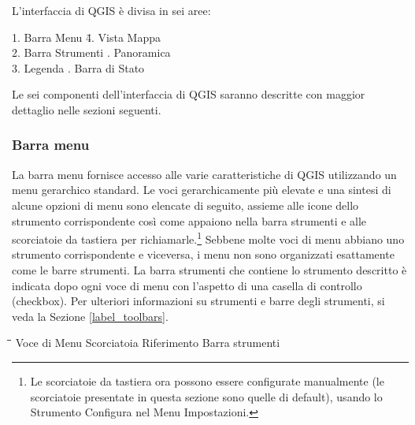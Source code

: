 L'interfaccia di QGIS è divisa in sei aree:

\begin{tabbing}
1. Barra Menu \hspace{3cm}\= 4. Vista Mappa \\
2. Barra Strumenti \hspace{3cm}. Panoramica  \\
3. Legenda \hspace{3cm}. Barra di Stato   
\end{tabbing}

Le sei componenti dell'interfaccia di QGIS saranno descritte con maggior dettaglio
nelle sezioni seguenti.

\subsubsection{Barra menu}\label{label_menubar}

La barra menu fornisce accesso alle varie caratteristiche di QGIS utilizzando un menu
gerarchico standard. Le voci gerarchicamente più elevate e una sintesi di alcune opzioni
di menu sono elencate di seguito, assieme alle icone dello strumento corrispondente
così come appaiono nella barra strumenti e alle scorciatoie da tastiera per richiamarle.\footnote{Le scorciatoie da tastiera ora possono
essere configurate manualmente (le scorciatoie presentate in questa sezione sono quelle di default), usando lo Strumento Configura 
nel Menu Impostazioni.}
Sebbene molte voci di menu abbiano uno strumento corrispondente e viceversa,
i menu non sono organizzati esattamente come le barre strumenti. 
La barra strumenti che contiene lo strumento descritto è indicata dopo ogni voce di menu
con l'aspetto di una casella di controllo (checkbox).
Per ulteriori informazioni su strumenti e barre degli strumenti, si veda la Sezione \ref{label_toolbars}.

\begin{tabbing}
\hspace{5.5cm}\=\hspace{3cm}\=\hspace{3.5cm}\= \kill
\hspace{1cm} Voce di Menu \> Scorciatoia \> Riferimento \> Barra strumenti\\
\end{tabbing}


